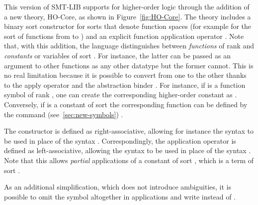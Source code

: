 \begin{newver}

This version of SMT-LIB supports for higher-order logic through the addition
of a new theory, HO-Core, as shown in Figure~\ref{fig:HO-Core}.
The theory includes a binary sort constructor \ter{->} for sorts 
that denote function spaces 
(for example  for the sort of functions from  to )
and an explicit function application operator \ter{\_}.
Note that, with this addition, the language distinguishes 
between \emph{functions} of rank 
and \emph{constants} or variables of sort .
For instance, the latter can be passed as an argument to other functions 
as any other datatype but the former cannot.
This is no real limitation because it is possible to convert from one to the other
thanks to the apply operator \ter{\_} and the abstraction binder .
For instance, if  is a function symbol of rank ,
one can create the corresponding higher-order constant as
.
Conversely, if  is a constant of sort 
the corresponding function can be defined by the command (see~\ref{sec:new-symbols})
.

The \ter{->} constructor is defined as right-associative, allowing for instance the syntax
 to be used in place of the syntax
.
Correspondingly, the application operator \ter{\_} is defined as left-associative, allowing the syntax
 to be used in place of the syntax
.
Note that this allows \emph{partial} applications  of a constant  
of sort ,
which is a term of sort .

As an additional simplification, which does not introduce ambiguities,  
it is possible to omit the \ter{\_} symbol altogether in applications and write
 instead of .
\end{newver} 


